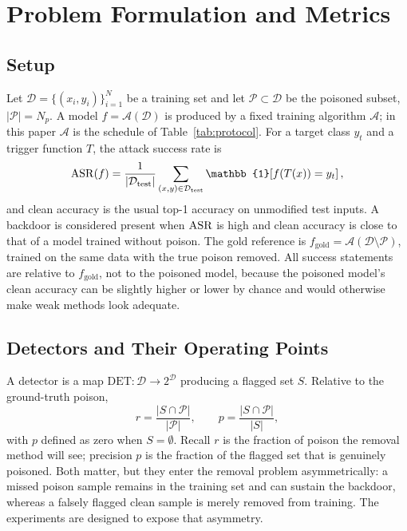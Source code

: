 \section{Problem Formulation and Metrics}
\label{sec:problem}

\subsection{Setup}
Let $\mathcal{D}=\{(x_i,y_i)\}_{i=1}^{N}$ be a training set and let
$\mathcal{P}\subset\mathcal{D}$ be the poisoned subset, $|\mathcal{P}|=N_p$.
A model $f=\mathcal{A}(\mathcal{D})$ is produced by a fixed training algorithm
$\mathcal{A}$; in this paper $\mathcal{A}$ is the schedule of
Table~\ref{tab:protocol}. For a target class $y_t$ and a trigger function $T$,
the attack success rate is
\begin{equation}
\ASR(f)=\frac{1}{|\mathcal{D}_{\mathrm{test}}|}
\sum_{(x,y)\in\mathcal{D}_{\mathrm{test}}}
\mathbb{1}\!\left[f(T(x))=y_t\right],
\label{eq:asr}
\end{equation}
and clean accuracy is the usual top-1 accuracy on unmodified test inputs. A
backdoor is considered present when $\mathrm{ASR}$ is high and clean accuracy is close
to that of a model trained without poison. The gold reference is
$f_{\mathrm{gold}}=\mathcal{A}(\mathcal{D}\setminus\mathcal{P})$, trained on the
same data with the true poison removed. All success statements are relative to
$f_{\mathrm{gold}}$, not to the poisoned model, because the poisoned model's
clean accuracy can be slightly higher or lower by chance and would otherwise
make weak methods look adequate.

\subsection{Detectors and Their Operating Points}
A detector is a map $\mathrm{DET}:\mathcal{D}\to 2^{\mathcal{D}}$ producing a
flagged set $S$. Relative to the ground-truth poison,
\begin{equation}
r=\frac{|S\cap\mathcal{P}|}{|\mathcal{P}|},\qquad
p=\frac{|S\cap\mathcal{P}|}{|S|},
\label{eq:det}
\end{equation}
with $p$ defined as zero when $S=\emptyset$. Recall $r$ is the fraction of
poison the removal method will see; precision $p$ is the fraction of the flagged
set that is genuinely poisoned. Both matter, but they enter the removal problem
asymmetrically: a missed poison sample remains in the training set and can
sustain the backdoor, whereas a falsely flagged clean sample is merely removed
from training. The experiments are designed to expose that asymmetry.

